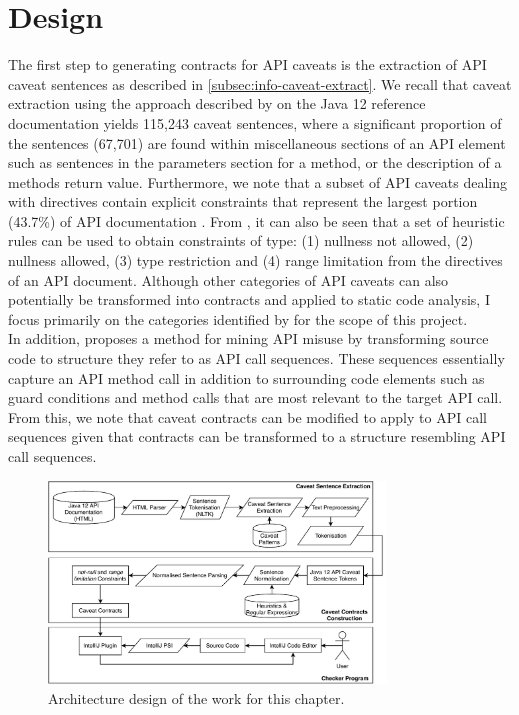 \section{Design}
\label{sec:contract-design}
The first step to generating contracts for API caveats is the extraction of API caveat sentences as described in \ref{subsec:info-caveat-extract}. We recall that caveat extraction using the approach described by \cite{caveat-knowledge-graph} on the Java 12 reference documentation yields 
115,243 caveat sentences, where a significant proportion of the sentences (67,701) are found within miscellaneous sections of an API element such as sentences in the parameters section for a method, or the description of a methods return value. Furthermore, we note that a subset of API caveats dealing with directives \cite{zhou-directive} contain explicit constraints that represent the largest portion (43.7\%) of API documentation \cite{directives-study}. From \cite{zhou-directive}, it can also be seen that a set of heuristic rules can be used to obtain constraints of type: (1) nullness not allowed, (2) nullness allowed, (3) type restriction and (4) range limitation from the directives of an API document. Although other categories of API caveats can also potentially be transformed into contracts and applied to static code analysis, I focus primarily on the categories identified by \cite{zhou-directive} for the scope of this project. \\

In addition, \cite{code-examples} proposes a method for mining API misuse by transforming source code to structure they refer to as API call sequences. These sequences essentially capture an API method call in addition to surrounding code elements such as guard conditions and method calls that are most relevant to the target API call. From this, we note that caveat contracts can be modified to apply to API call sequences given that contracts can be transformed to a structure resembling API call sequences.

\begin{figure}
	\label{fig:contracct-architecture}
	\centering
	\includegraphics[width=0.8\textwidth]{figs/contract-architecture.pdf}
	\caption{Architecture design of the work for this chapter.}
\end{figure}


